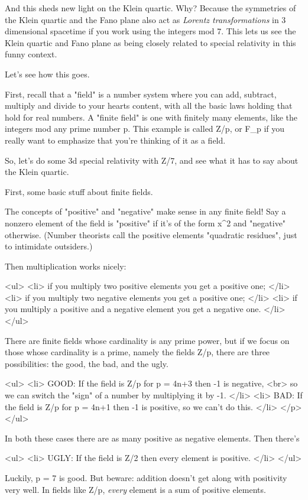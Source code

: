 And this sheds new light on the Klein quartic.  Why?  Because the symmetries of 
the Klein quartic and the Fano plane also act as \emph{Lorentz transformations} in 3 
dimensional spacetime if you work using the integers mod 7.  This lets us see the 
Klein quartic and Fano plane as being closely related to special relativity in this 
funny context.

Let's see how this goes.

First, recall that a "field" 
is a number system where you can add, subtract, 
multiply and divide to your hearts content, with all the basic laws holding that 
hold for real numbers.  A "finite field"
is one with finitely many elements, like
the integers mod any prime number p.  This example is called Z/p, or 
F_{p} if you 
really want to emphasize that you're thinking of it as a field.

So, let's do some 3d special relativity with Z/7, and see what it has to say
about the Klein quartic.  

First, some basic stuff about finite fields.

The concepts of "positive" 
and "negative" make sense in any finite field!  
Say a nonzero element of the field is 
"positive" 
if it's of the form x^{2} 
and "negative" 
otherwise.  (Number theorists call the positive elements 
"quadratic residues", just to intimidate outsiders.) 

Then multiplication works nicely: 

<ul>
<li>
  if you multiply two positive elements you get a positive one;
</li>
<li>
 if you multiply two negative elements you get a positive one;
</li>
<li>
 if you multiply a positive and a negative element you get a negative one.
</li>
</ul>

There are finite fields whose cardinality is any prime power, but if we focus on 
those whose cardinality is a prime, namely the fields Z/p, there are three 
possibilities: the good, the bad, and the ugly. 

<ul>
<li>
 GOOD: If the field is Z/p for p = 4n+3 then -1 is negative, <br>
 so we
 can switch the "sign" of a number by multiplying it by -1.  
</li>
<li>
 BAD: If the field is Z/p for p = 4n+1 then -1 is positive, so we
 can't do this.
</li>
</p>
</ul>

In both these cases there are as many positive as negative elements.
Then there's

<ul>
<li>
 UGLY: If the field is Z/2 then every element is positive.
</li>
</ul>

Luckily, p = 7 is good.   But beware: addition doesn't get along with positivity 
very well.  In fields like Z/p, \emph{every} element is a sum of positive elements.

